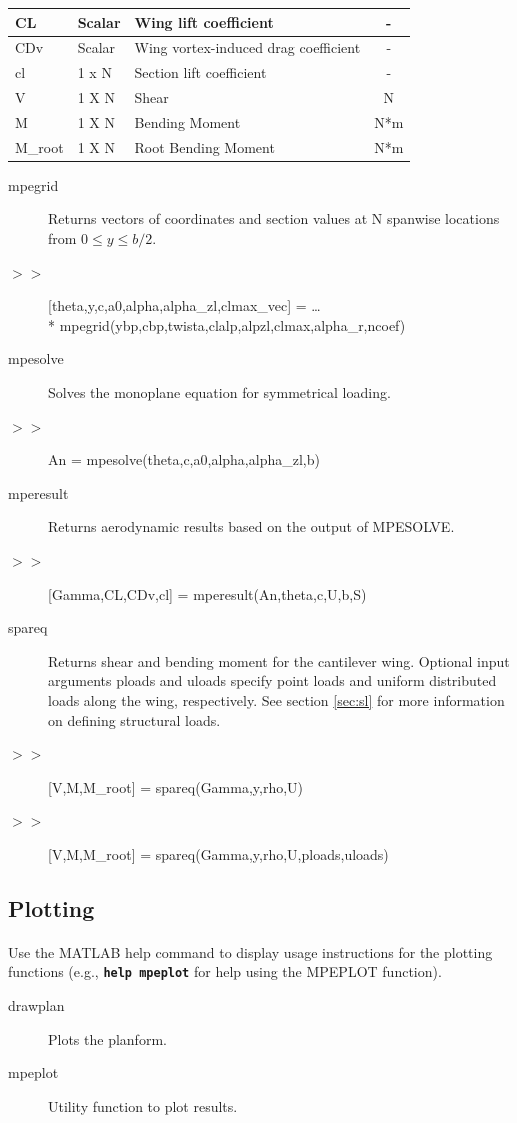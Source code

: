 \documentclass{article}
\begin{document}
\begin{tabular}{|l|l|p{2.5in}|c|}
  \hline
  CL & Scalar &
  Wing lift coefficient &
  -
  \\
  \hline
  CDv & Scalar &
  Wing vortex-induced drag coefficient &
  -
  \\
  \hline
  cl & 1 x N &
  Section lift coefficient &
  -
  \\
  \hline
  V & 1 X N &
  Shear &
  N
  \\
  \hline
  M & 1 X N &
  Bending Moment &
  N*m
  \\
  \hline
  M\_root & 1 X N &
  Root Bending Moment &
  N*m
  \\
  \hline
\end{tabular}
\begin{description}
  \item[mpegrid] Returns vectors of coordinates and section values at
    N spanwise locations from $0 \leq y \leq b/2$.
  \item[$>>$] [theta,y,c,a0,alpha,alpha\_zl,clmax\_vec] = \ldots\\*
    mpegrid(ybp,cbp,twista,clalp,alpzl,clmax,alpha\_r,ncoef)
  \item[mpesolve] Solves the monoplane equation for symmetrical
    loading.
  \item[$>>$] An = mpesolve(theta,c,a0,alpha,alpha\_zl,b)
  \item[mperesult] Returns aerodynamic results based on the
    output of MPESOLVE.
  \item[$>>$] [Gamma,CL,CDv,cl] = mperesult(An,theta,c,U,b,S)
  \item[spareq] Returns shear and bending moment for the cantilever
    wing.  Optional input arguments ploads and uloads specify point
    loads and uniform distributed loads along the wing, respectively.
    See section \ref{sec:sl} for more information on defining
    structural loads.
  \item[$>>$] [V,M,M\_root] = spareq(Gamma,y,rho,U)
  \item[$>>$] [V,M,M\_root] = spareq(Gamma,y,rho,U,ploads,uloads)
\end{description}
\subsection{Plotting}
\paragraph{}
Use the MATLAB help command to display usage instructions for the
plotting functions (e.g., \texttt{\textbf{help mpeplot}} for help
using the MPEPLOT function).
\begin{description}
\item[drawplan] Plots the planform.
\item[mpeplot] Utility function to plot results.
\end{description}
\newpage
\printbibliography
\end{document}
